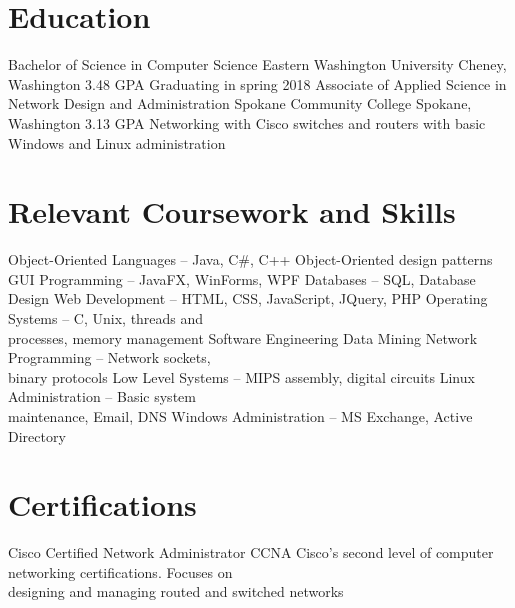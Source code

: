 \documentclass[11pt,letterpaper,sans]{moderncv}
\begin{document}
\makecvtitle{}


\section{Education}
	{Bachelor of Science in Computer Science}
	{Eastern Washington University}
	{Cheney, Washington}
	{3.48 GPA}
	{Graduating in spring 2018}
	{Associate of Applied Science in Network Design and Administration}
	{Spokane Community College}
	{Spokane, Washington}
	{3.13 GPA}
	{Networking with Cisco switches and routers with basic Windows and Linux
	administration}


\section{Relevant Coursework and Skills}
\cvlistdoubleitem %
	{Object-Oriented Languages -- Java, C\#, C++} %
	{Object-Oriented design patterns}
\cvlistdoubleitem %
	{GUI Programming -- JavaFX, WinForms, WPF} %
	{Databases -- SQL, Database Design} %
\cvlistdoubleitem %
	{Web Development -- HTML, CSS, JavaScript, JQuery, PHP} %
	{Operating Systems -- C, Unix, threads and\\ processes, memory management} %
\cvlistdoubleitem %
	{Software Engineering} %
	{Data Mining} %
\cvlistdoubleitem %
	{Network Programming -- Network sockets,\\ binary protocols} %
	{Low Level Systems -- MIPS assembly, digital circuits} %
\cvlistdoubleitem %
	{Linux Administration -- Basic system\\ maintenance, Email, DNS} %
	{Windows Administration -- MS Exchange, Active Directory} %


\section{Certifications}
	{Cisco Certified Network Administrator}
	{CCNA}
	{}
	{}
	{Cisco's second level of computer networking certifications. Focuses on\\
	designing and managing routed and switched networks}



\clearpage

\end{document}
